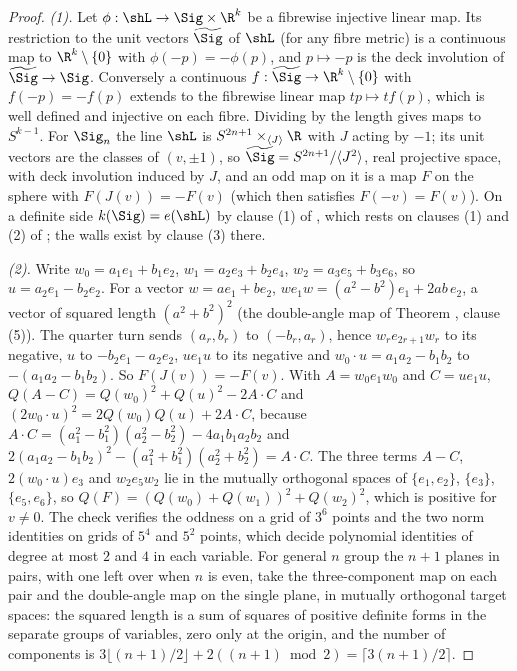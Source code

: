 \begin{proof}
\emph{(1).} Let $\phi : \shL \to \Sig \times \R^{k}$ be a fibrewise injective linear map. Its restriction to the unit vectors $\widetilde\Sig$ of $\shL$ (for any fibre metric) is a continuous map to $\R^{k} \setminus \{0\}$ with $\phi(-p) = -\phi(p)$, and $p \mapsto -p$ is the deck involution of $\widetilde\Sig \to \Sig$. Conversely a continuous $f : \widetilde\Sig \to \R^{k} \setminus \{0\}$ with $f(-p) = -f(p)$ extends to the fibrewise linear map $tp \mapsto tf(p)$, which is well defined and injective on each fibre. Dividing by the length gives maps to $S^{k-1}$. For $\Sig_{n}$ the line $\shL$ is $S^{2n+1} \times_{\langle J \rangle} \R$ with $J$ acting by $-1$; its unit vectors are the classes of $(v, \pm 1)$, so $\widetilde\Sig = S^{2n+1}/\langle J^{2} \rangle$, real projective space, with deck involution induced by $J$, and an odd map on it is a map $F$ on the sphere with $F(J(v)) = -F(v)$ (which then satisfies $F(-v) = F(v)$). On a definite side $k(\Sig) = e(\shL)$ by clause (1) of , which rests on clauses (1) and (2) of ; the walls exist by clause (3) there.

\emph{(2).} Write $w_{0} = a_{1}e_{1} + b_{1}e_{2}$, $w_{1} = a_{2}e_{3} + b_{2}e_{4}$, $w_{2} = a_{3}e_{5} + b_{3}e_{6}$, so $u = a_{2}e_{1} - b_{2}e_{2}$. For a vector $w = ae_{1} + be_{2}$, $w e_{1} w = (a^{2} - b^{2})e_{1} + 2ab\,e_{2}$, a vector of squared length $(a^{2} + b^{2})^{2}$ (the double-angle map of Theorem , clause (5)). The quarter turn sends $(a_{r}, b_{r})$ to $(-b_{r}, a_{r})$, hence $w_{r}e_{2r+1}w_{r}$ to its negative, $u$ to $-b_{2}e_{1} - a_{2}e_{2}$, $u e_{1} u$ to its negative and $w_{0}\cdot u = a_{1}a_{2} - b_{1}b_{2}$ to $-(a_{1}a_{2} - b_{1}b_{2})$. So $F(J(v)) = -F(v)$. With $A = w_{0}e_{1}w_{0}$ and $C = ue_{1}u$, $Q(A - C) = Q(w_{0})^{2} + Q(u)^{2} - 2A\cdot C$ and $(2w_{0}\cdot u)^{2} = 2Q(w_{0})Q(u) + 2A\cdot C$, because $A\cdot C = (a_{1}^{2} - b_{1}^{2})(a_{2}^{2} - b_{2}^{2}) - 4a_{1}b_{1}a_{2}b_{2}$ and $2(a_{1}a_{2} - b_{1}b_{2})^{2} - (a_{1}^{2} + b_{1}^{2})(a_{2}^{2} + b_{2}^{2}) = A\cdot C$. The three terms $A - C$, $2(w_{0}\cdot u)e_{3}$ and $w_{2}e_{5}w_{2}$ lie in the mutually orthogonal spaces of $\{e_{1}, e_{2}\}$, $\{e_{3}\}$, $\{e_{5}, e_{6}\}$, so $Q(F) = (Q(w_{0}) + Q(w_{1}))^{2} + Q(w_{2})^{2}$, which is positive for $v \neq 0$. The check verifies the oddness on a grid of $3^{6}$ points and the two norm identities on grids of $5^{4}$ and $5^{2}$ points, which decide polynomial identities of degree at most $2$ and $4$ in each variable. For general $n$ group the $n + 1$ planes in pairs, with one left over when $n$ is even, take the three-component map on each pair and the double-angle map on the single plane, in mutually orthogonal target spaces: the squared length is a sum of squares of positive definite forms in the separate groups of variables, zero only at the origin, and the number of components is $3\lfloor (n+1)/2 \rfloor + 2((n+1) \bmod 2) = \lceil 3(n+1)/2 \rceil$.


\end{proof}
